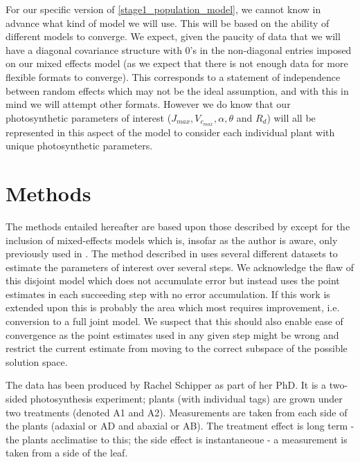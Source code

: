 \documentclass[11pt]{article} %
\begin{document}
For our specific version of \eqref{stage1_population_model}, we cannot know in advance what kind of model we will use. This will be based on the ability of different models to converge. We expect, given the paucity of data that we will have a diagonal covariance structure with 0's in the non-diagonal entries imposed on our mixed effects model (as we expect that there is not enough data for more flexible formats to converge). This corresponds to a statement of independence between random effects which may not be the ideal assumption, and with this in mind we will attempt other formats. However we do know that our photosynthetic parameters of interest ($J_{max}, V_{c_{max}}, \alpha, \theta$ and $R_d$) will all be represented in this aspect of the model to consider each individual plant with unique photosynthetic parameters.

\section{Methods}
The methods entailed hereafter are based upon those described by \citet{YinUsingcombinedmeasurements2009} except for the inclusion of mixed-effects models which is, insofar as the author is aware, only previously used in \cite{QianEstimationphotosynthesisparameters2012}. The method described in \cite{YinUsingcombinedmeasurements2009} uses several different datasets to estimate the parameters of interest over several steps. We acknowledge the flaw of this disjoint model which does not accumulate error but instead uses the point estimates in each succeeding step with no error accumulation. If this work is extended upon this is probably the area which most requires improvement, i.e. conversion to a full joint model. We suspect that this should also enable ease of convergence as the point estimates used in any given step might be wrong and restrict the current estimate from moving to the correct subspace of the possible solution space.

The data has been produced by Rachel Schipper as part of her PhD. It is a two-sided photosynthesis experiment; plants (with individual tags) are grown under two treatments (denoted A1 and A2). Measurements are taken from each side of the plants (adaxial or AD and abaxial or AB). The treatment effect is long term - the plants acclimatise to this; the side effect is instantaneoue - a measurement is taken from a side of the leaf.
\end{document}
